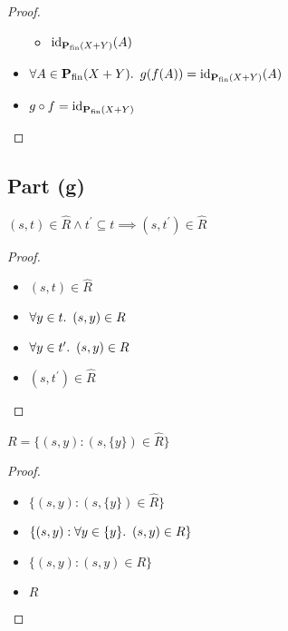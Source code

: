 \begin{prop}
\begin{proof}
\begin{itemize}
\begin{itemize}
          \item[\eqs]
            $\operatorname{id}_{\mathbf{P}_{\operatorname{fin}}(X + Y)}(A)$
        \end{itemize}

      \item[\imps]
        $\forall A\in\mathbf{P}_{\operatorname{fin}}(X+Y)\ldotp~g(f(A)) = \operatorname{id}_{\mathbf{P}_{\operatorname{fin}}(X+Y)}(A)$

      \item[\imps]
        $g\circ f = \operatorname{id}_{\mathbf{P}_{\operatorname{fin}}(X+Y)}$
        \qedhere
        \marginnote{\Def-$=$}
    \end{itemize}
  \end{proof}
\end{prop}

\subsection{Part (g)}\label{sec:q-2-g}

\begin{prop}
  $(s,t)\in\widehat{R}\land t^\prime\subseteq t\implies (s,t^\prime)\in\widehat{R}$
  \begin{proof}~\\
    \begin{itemize}
      \item[\phantom{\imps}]
        $(s,t)\in\widehat{R}$
        \marginnote{\Hyp}

      \item[\iffs]
        $\forall y\in t\ldotp~(s,y)\in R$

      \item[\imps]
        $\forall y\in t^\prime\ldotp~(s,y)\in R$

      \item[\iffs]
        $(s, t^\prime)\in\widehat{R}$
        \qedhere
    \end{itemize}
  \end{proof}
\end{prop}

\begin{prop}\label{prop:rel-rel-hat}
  $R = \{(s,y) : (s,\{y\})\in\widehat{R}\}$
  \begin{proof}~\\
    \begin{itemize}
      \item[\phs] $\{(s,y):(s,\{y\})\in\widehat{R}\}$

      \item[\eqs] $\{(s,y):\forall y\in\{y\}\ldotp~(s,y)\in R\}$

      \item[\eqs] $\{(s,y):(s,y)\in R\}$

      \item[\eqs] $R$\qedhere
    \end{itemize}
  \end{proof}
\end{prop}

